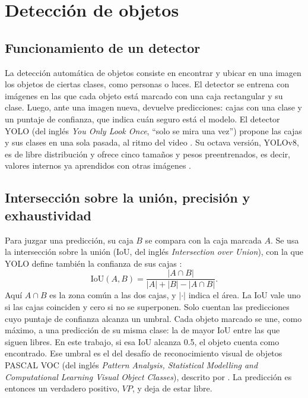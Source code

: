 \section{Detección de objetos}
\label{sec:marco-deteccion}

\subsection{Funcionamiento de un detector}

La detección automática de objetos consiste en encontrar y ubicar en una imagen los objetos de ciertas
clases, como personas o luces. El detector se entrena con imágenes en las que cada objeto está marcado
con una caja rectangular y su clase. Luego, ante una imagen nueva, devuelve predicciones: cajas con una
clase y un puntaje de confianza, que indica cuán seguro está el modelo. El detector YOLO
(del inglés \textit{You Only Look Once}, \enquote{solo se mira una vez}) propone las cajas y sus clases
en una sola pasada, al ritmo del video \parencite{redmon2016}. Su octava versión, YOLOv8, es de libre
distribución y ofrece cinco tamaños y pesos preentrenados, es decir, valores internos ya aprendidos con
otras imágenes \parencite{jocher2023}.

\subsection{Intersección sobre la unión, precisión y exhaustividad}

Para juzgar una predicción, su caja $B$ se compara con la caja marcada $A$. Se usa la intersección sobre
la unión (IoU, del inglés \textit{Intersection over Union}), con la que YOLO define también la
confianza de sus cajas \parencite{redmon2016}:
\begin{equation} \mathrm{IoU}(A,B)=\frac{\lvert A\cap B\rvert}{\lvert A\rvert+\lvert B\rvert-\lvert A\cap B\rvert}. \label{eq:iou} \end{equation}
Aquí $A\cap B$ es la zona común a las dos cajas, y $\lvert\cdot\rvert$ indica el área. La IoU vale uno si
las cajas coinciden y cero si no se superponen. Solo cuentan las predicciones cuyo puntaje de confianza
alcanza un umbral. Cada objeto marcado se une, como máximo, a una predicción de su misma clase: la de
mayor IoU entre las que siguen libres. En este trabajo, si esa IoU alcanza 0.5, el objeto cuenta como
encontrado. Ese umbral es el del desafío de reconocimiento visual de objetos PASCAL VOC (del inglés
\textit{Pattern Analysis, Statistical Modelling and Computational Learning Visual Object Classes}),
descrito por \textcite{everingham2010}. La predicción es entonces un verdadero positivo, $\mathit{VP}$,
y deja de estar libre.


